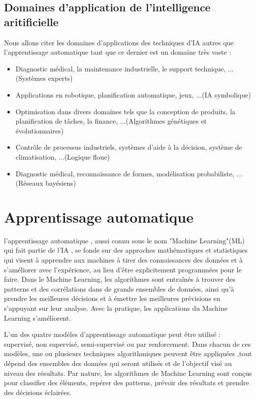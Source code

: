 \subsection{Domaines d'application de l'intelligence aritificielle}
    Nous allons citer les domaines d'applications des techniques d'IA autres que l'apprentissage automatique tant que ce dernier est un domaine très vaste :
    \begin{itemize}[label=$\bullet$]
    \item Diagnostic médical, la maintenance industrielle, le support technique, ...(Systèmes experts)
    \item Applications en robotique, planification automatique, jeux, ...(IA symbolique)
    \item Optimisation dans divers domaines tels que la conception de   produits, la planification de tâches, la finance, ...(Algorithmes génétiques et évolutionnaires)
    \item Contrôle de processus industriels, systèmes d'aide à la   décision, système de climatisation, ...(Logique floue)
    \item Diagnostic médical, reconnaissance de formes, modélisation probabiliste, ...(Réseaux bayésiens)
    \end{itemize}

\section{Apprentissage automatique}
    l'apprentissage automatique , aussi connu sous le nom "Machine Learning"(ML) qui fait partie de l'IA , se fonde sur des approches mathématiques et statistiques qui visent à apprendre aux machines à tirer des connaissances des données et à s'améliorer avec l'expérience, au lieu d'être explicitement programmées pour le faire.
    Dans le Machine Learning, les algorithmes sont entraînés à trouver des patterns et des corrélations dans de grands ensembles de données, ainsi qu'à prendre les meilleures décisions et à émettre les meilleures prévisions en s'appuyant sur leur analyse. Avec la pratique, les applications du Machine Learning s'améliorent. \cite{what_is_machine_learning}

     L'un des quatre modèles d'apprentissage automatique peut être utilisé : supervisé, non supervisé, semi-supervisé ou par renforcement. Dans chacun de ces modèles, une ou plusieurs techniques algorithmiques peuvent être appliquées ,tout dépend des ensembles des données qui seront utilisés et de l'objectif visé au niveau des résultats. Par nature, les algorithmes de Machine Learning sont conçus pour classifier des éléments, repérer des patterns, prévoir des résultats et prendre des décisions éclairées. \cite{what_is_machine_learning}

